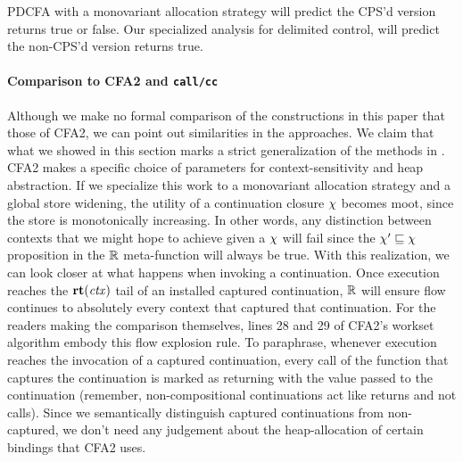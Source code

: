 {\begin{small}
\begin{SCodeFlow}
\begin{RktBlk}
\begin{SingleColumn}
\mbox{}\RktPn{(}\mbox{}\mbox{}\RktPn{(}\RktSym{$\lambda$}\mbox{}\RktPn{(}\RktPn{)}\mbox{}\RktPn{(}\mbox{}\mbox{}\RktPn{(}\RktSym{$\lambda$}\mbox{}\RktPn{(}\RktPn{)}\mbox{}\RktPn{(}\RktSym{$\le$}\mbox{}\mbox{}\RktPn{)}\RktPn{)}\RktPn{)}\RktPn{)}\RktPn{)}\RktPn{)}\end{SingleColumn}\end{RktBlk}\end{SCodeFlow}
\end{small}
PDCFA with a monovariant allocation strategy will predict the CPS'd version returns true or false.
%
Our specialized analysis for delimited control, will predict the non-CPS'd version returns true.}

\paragraph{Comparison to CFA2 and \texttt{call/cc}}
Although we make no formal comparison of the constructions in this paper that those of CFA2, we can point out similarities in the approaches.
%
We claim that what we showed in this section marks a strict generalization of the methods in \citet{dvanhorn:Vardoulakis2011Pushdown}.
%
CFA2 makes a specific choice of parameters for context-sensitivity and heap abstraction.
%
If we specialize this work to a monovariant allocation strategy and a global store widening, the utility of a continuation closure $\chi$ becomes moot, since the store is monotonically increasing.
%
In other words, any distinction between contexts that we might hope to achieve given a $\chi$ will fail since the $\chi' \sqsubseteq \chi$ proposition in the ${\mathbb R}$ meta-function will always be true.
%
With this realization, we can look closer at what happens when invoking a continuation.
%
Once execution reaches the $\mathbf{rt}(\mathit{ctx})$ tail of an installed captured continuation, ${\mathbb R}$ will ensure flow continues to absolutely every context that captured that continuation.
%
For the readers making the comparison themselves, lines 28 and 29 of CFA2's workset algorithm embody this flow explosion rule.
%
To paraphrase, whenever execution reaches the invocation of a captured continuation, every call of the function that captures the continuation is marked as returning with the value passed to the continuation (remember, non-compositional continuations act like returns and not calls).
%
Since we semantically distinguish captured continuations from non-captured, we don't need any judgement about the heap-allocation of certain bindings that CFA2 uses.

